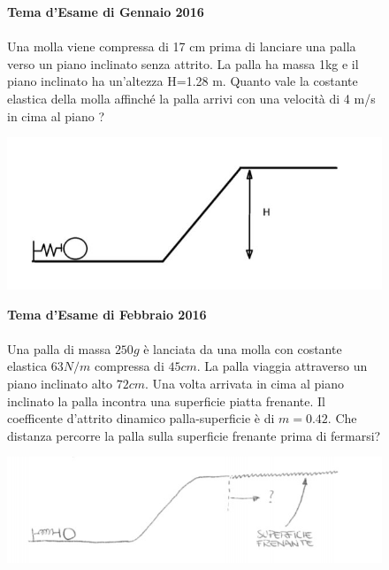 
\begin{figure}[h!]
\textbf{Tema d'Esame di Gennaio 2016}\\ \\
Una molla viene compressa di 17 cm prima di lanciare una palla verso un piano inclinato
senza attrito. La palla ha massa 1kg e il piano inclinato ha un'altezza H=1.28 m. Quanto vale
la costante elastica della molla affinché la palla arrivi con una velocità di 4 m/s in cima al
piano ?
\\
	\begin{center}
		\includegraphics[scale=0.5]{ES2/GEN022016.jpg}
	\end{center}
\end{figure}

\begin{figure}[h!]
\textbf{Tema d'Esame di Febbraio 2016}\\ \\
Una palla di massa $250g$ è lanciata da una molla con costante elastica $63 N/m$ compressa di $45 cm$. La palla viaggia attraverso un piano inclinato alto $72 cm$. Una volta arrivata in cima al piano inclinato la palla incontra una superficie piatta frenante. Il coefficente d'attrito dinamico palla-superficie è di $m=0.42$. Che distanza percorre la palla sulla superficie frenante prima di fermarsi?
\\
	\begin{center}
		\includegraphics[scale=0.5]{ES2/FEB022016.jpg}
	\end{center}
\end{figure}

